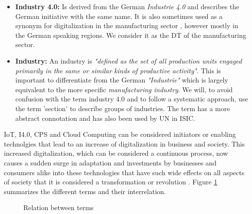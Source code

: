 \begin{itemize}
  \item  \textbf{Industry 4.0:} Is derived from the German \emph{Industrie 4.0} and describes the German initiative with the same name. It is also sometimes used as a synonym for digitalization in the manufacturing sector \cite{McKinseydigitizationIndustrialSector:2015}, however mostly in the German speaking regions. We consider it as the \acl{DT} of the manufacturing sector.


  \item \textbf{Industry:} An industry is \emph{"defined as the set of all production units engaged primarily in the same or similar kinds of productive activity"}\cite{ISIC:2008}. This is important to differentiate from the German \emph{"Industrie"} which is largely equivalent to the more specific \emph{manufacturing industry}. We will, to avoid confusion with the term industry 4.0 and to follow a systematic approach, use the term 'section' to describe groups of industries. The term has a more abstract connotation and has also been used by \ac{UN} in \ac{ISIC}\cite{ISIC:2008}. 

\end{itemize}

\ac{IoT}, \ac{I4.0}, \ac{CPS} and Cloud Computing can be considered initiators or enabling technolgies that lead to an increase of digitalization in business and society. This increased digitalization, which can be considered a continuous process, now causes a sudden surge in adaptation and investments by businesses and consumers alike into these technologies that have such wide effects on all aspects of society that it is considered a transformation or revolution \cite{Kagermann:2013}. 
Figure \ref{fig:terms} summarizes the different terms and their interrelation.

\begin{figure}[H]
\centering
{}
\caption{Relation between terms} \label{fig:terms}
\end{figure}

